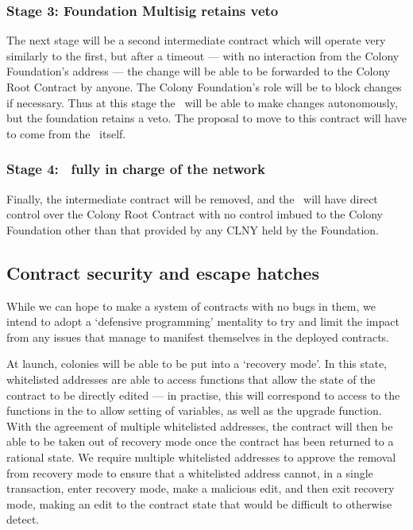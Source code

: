 \subsubsection*{Stage 3: Foundation Multisig retains veto}
The next stage will be a second intermediate contract which will operate very similarly to the first, but after a timeout --- with no interaction from the Colony Foundation's address --- the change will be able to be forwarded to the Colony Root Contract by anyone. The Colony Foundation's role will be to block changes if necessary. Thus at this stage the \rc\ will be able to make changes autonomously, but the foundation retains a veto.  The proposal to move to this contract will have to come from the \rc\ itself. 

\subsubsection*{Stage 4: \rc\ fully in charge of the network}
Finally, the intermediate contract will be removed, and the \rc\ will have direct control over the Colony Root Contract with no control imbued to the Colony Foundation other than that provided by any CLNY held by the Foundation. 

\subsection{Contract security and escape hatches}
While we can hope to make a system of contracts with no bugs in them, we intend to adopt a `defensive programming' mentality to try and limit the impact from any issues that manage to manifest themselves in the deployed contracts.

At launch, colonies will be able to be put into a `recovery mode'. In this state, whitelisted addresses are able to access functions that allow the state of the contract to be directly edited --- in practise, this will correspond to access to the functions in the  to allow setting of variables, as well as the upgrade function. With the agreement of multiple whitelisted addresses, the contract will then be able to be taken out of recovery mode once the contract has been returned to a rational state. We require multiple whitelisted addresses to approve the removal from recovery mode to ensure that a whitelisted address cannot, in a single transaction, enter recovery mode, make a malicious edit, and then exit recovery mode, making an edit to the contract state that would be difficult to otherwise detect.


